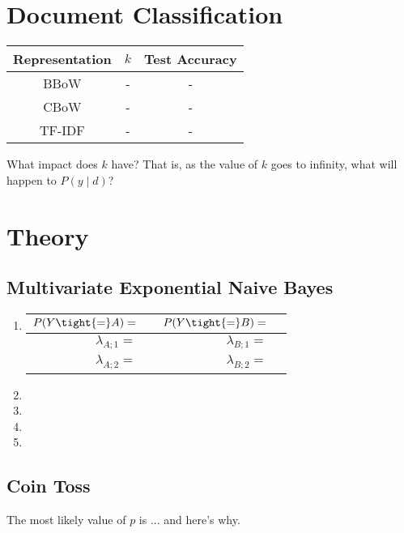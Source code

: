 \documentclass{article}
\begin{document}
\section*{Document Classification}

\begin{center}
    \begin{tabular}{|c|c|c|}
        \hline
        Representation & $k$ & Test Accuracy \\
        \hline
        BBoW & - & - \\
        CBoW & - & - \\
        TF-IDF & - & - \\
        \hline
    \end{tabular}
\end{center}

What impact does $k$ have?
That is, as the value of $k$ goes to infinity, what will happen to $P(y \mid d)$?


\section*{Theory}
\subsection*{Multivariate Exponential Naive Bayes}
\begin{enumerate}
    \item
        \begin{center}
            \begin{tabular}{|rp{1in}|rp{1in}|}
                \hline
                $P(Y\tight{=}A)=$ & & $P(Y\tight{=}B)=$ & \\ \hline
                $\lambda_{A;1}=$ & & $\lambda_{B;1}=$ & \\ \hline
                $\lambda_{A;2}=$ & & $\lambda_{B;2}=$ & \\ \hline
            \end{tabular}
        \end{center}
    \item
    \item
    \item
    \item
\end{enumerate}

\subsection*{Coin Toss}
The most likely value of $p$ is ... and here's why.
\end{document}
